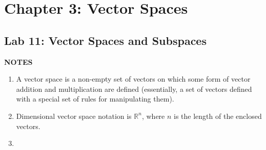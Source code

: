 \documentclass[12pt]{article}
\newcommand{\notes}{\textbf{NOTES}}
\begin{document}
\section{Chapter 3: Vector Spaces}

\subsection{Lab 11: Vector Spaces and Subspaces}

\notes

\begin{enumerate}
\item A vector space is a non-empty set of vectors on which some form of vector addition and multiplication are defined (essentially, a set of vectors defined with a special set of rules for manipulating them). 
\item Dimensional vector space notation is $\mathbb{R}^{n}$, where $n$ is the length of the enclosed vectors.
\item
\end{enumerate}
\end{document}
